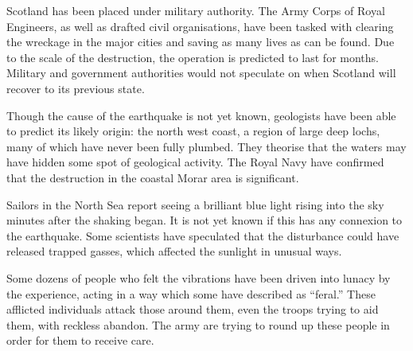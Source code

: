 \documentclass{newspaper1920}
\def\minipageheight{37}
\begin{document}
\begin{multicols}{3}
\begin{minipage}[t][\minipageheight\baselineskip]{2\columnwidth+1\columnsep}
\begin{multicols}{2}
Scotland has been placed under military authority.  The Army Corps of
Royal Engineers, as well as drafted civil organisations, have been
tasked with clearing the wreckage in the major cities and saving as
many lives as can be found.  Due to the scale of the destruction, the
operation is predicted to last for months.  Military and government
authorities would not speculate on when Scotland will recover to its
previous state.

Though the cause of the earthquake is not yet known, geologists have
been able to predict its likely origin: the north west coast, a region
of large deep lochs, many of which have never been fully plumbed.
They theorise that the waters may have hidden some spot of geological
activity.  The Royal Navy have confirmed that the destruction in the
coastal Morar area is significant.


Sailors in the North Sea report seeing a brilliant blue light rising
into the sky minutes after the shaking began.  It is not yet known if
this has any connexion to the earthquake.  Some scientists have
speculated that the disturbance could have released trapped gasses,
which affected the sunlight in unusual ways.


Some dozens of people who felt the vibrations have been driven into
lunacy by the experience, acting in a way which some have described as
``feral.''  These afflicted individuals attack those around them, even
the troops trying to aid them, with reckless abandon.  The army are
trying to round up these people in order for them to receive care.

\end{multicols}

\vspace{-\baselineskip}\fullrule

\end{minipage}



\fullrule



\halfrule



\begin{minipage}[t][\minipageheight\baselineskip]{2\columnwidth+1\columnsep}
\end{minipage}



\fullrule



\end{multicols}
\end{document}

